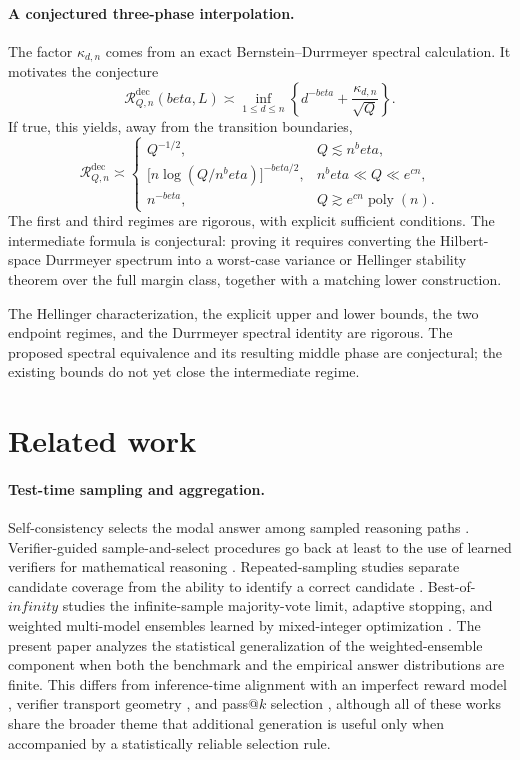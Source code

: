 \documentclass[11pt]{article}
\def\beta{beta}%
\def\infty{infinity}%
\newcommand{\calR}{\mathcal R}
\begin{document}
\paragraph{A conjectured three-phase interpolation.}
The factor $\kappa_{d,n}$ comes from an exact Bernstein--Durrmeyer spectral calculation.  It motivates the conjecture
\[
\calR^{\mathrm{dec}}_{Q,n}(\beta,L)
\asymp
\inf_{1\le d\le n}
\left\{
d^{-\beta}
+
\frac{\kappa_{d,n}}{\sqrt Q}
\right\}.
\]
If true, this yields, away from the transition boundaries,
\[
\calR^{\mathrm{dec}}_{Q,n}
\asymp
\begin{cases}
Q^{-1/2},
&Q\lesssim n^\beta,\\[0.8ex]
\bigl[n\log(Q/n^\beta)\bigr]^{-\beta/2},
&n^\beta\ll Q\ll e^{cn},\\[0.8ex]
n^{-\beta},
&Q\gtrsim e^{cn}\operatorname{poly}(n).
\end{cases}
\]
The first and third regimes are rigorous, with explicit sufficient conditions.  The intermediate formula is conjectural: proving it requires converting the Hilbert-space Durrmeyer spectrum into a worst-case variance or Hellinger stability theorem over the full margin class, together with a matching lower construction.

The Hellinger characterization, the explicit upper and lower bounds, the two endpoint regimes, and the Durrmeyer spectral identity are rigorous.  The proposed spectral equivalence and its resulting middle phase are conjectural; the existing bounds do not yet close the intermediate regime.

\section{Related work}

\paragraph{Test-time sampling and aggregation.}
Self-consistency selects the modal answer among sampled reasoning paths \citep{WangSelfConsistency}.  Verifier-guided sample-and-select procedures go back at least to the use of learned verifiers for mathematical reasoning \citep{CobbeVerifiers}.  Repeated-sampling studies separate candidate coverage from the ability to identify a correct candidate \citep{BrownMonkeys}.  Best-of-$\infty$ studies the infinite-sample majority-vote limit, adaptive stopping, and weighted multi-model ensembles learned by mixed-integer optimization \citep{KomiyamaBoInf}.  The present paper analyzes the statistical generalization of the weighted-ensemble component when both the benchmark and the empirical answer distributions are finite.  This differs from inference-time alignment with an imperfect reward model \citep{HuangBestN}, verifier transport geometry \citep{MukherjeeOT}, and pass@$k$ selection \citep{DiBestMajority}, although all of these works share the broader theme that additional generation is useful only when accompanied by a statistically reliable selection rule.
\end{document}
